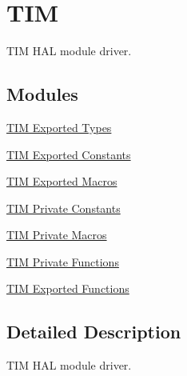 \hypertarget{group___t_i_m}{}\section{T\+IM}
\label{group___t_i_m}


T\+IM H\+AL module driver.  


\subsection*{Modules}
\begin{DoxyCompactItemize}
\item 
\hyperlink{group___t_i_m___exported___types}{T\+I\+M Exported Types}
\item 
\hyperlink{group___t_i_m___exported___constants}{T\+I\+M Exported Constants}
\item 
\hyperlink{group___t_i_m___exported___macros}{T\+I\+M Exported Macros}
\item 
\hyperlink{group___t_i_m___private___constants}{T\+I\+M Private Constants}
\item 
\hyperlink{group___t_i_m___private___macros}{T\+I\+M Private Macros}
\item 
\hyperlink{group___t_i_m___private___functions}{T\+I\+M Private Functions}
\item 
\hyperlink{group___t_i_m___exported___functions}{T\+I\+M Exported Functions}
\end{DoxyCompactItemize}


\subsection{Detailed Description}
T\+IM H\+AL module driver. 

